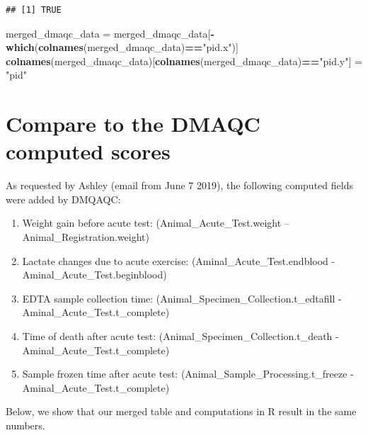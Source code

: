 \documentclass[]{article}
\newenvironment{Shaded}{\begin{snugshade}}{\end{snugshade}}
\newcommand{\KeywordTok}[1]{\textcolor[rgb]{0.13,0.29,0.53}{\textbf{#1}}}
\newcommand{\StringTok}[1]{\textcolor[rgb]{0.31,0.60,0.02}{#1}}
\newcommand{\OperatorTok}[1]{\textcolor[rgb]{0.81,0.36,0.00}{\textbf{#1}}}
\newcommand{\NormalTok}[1]{#1}
\providecommand{\tightlist}{%
  \setlength{\itemsep}{0pt}\setlength{\parskip}{0pt}}
\begin{document}
\begin{verbatim}
## [1] TRUE
\end{verbatim}

\begin{Shaded}
\begin{Highlighting}[]
\NormalTok{merged_dmaqc_data =}\StringTok{ }\NormalTok{merged_dmaqc_data[}\OperatorTok{-}\KeywordTok{which}\NormalTok{(}\KeywordTok{colnames}\NormalTok{(merged_dmaqc_data)}\OperatorTok{==}\StringTok{"pid.x"}\NormalTok{)]}
\KeywordTok{colnames}\NormalTok{(merged_dmaqc_data)[}\KeywordTok{colnames}\NormalTok{(merged_dmaqc_data)}\OperatorTok{==}\StringTok{"pid.y"}\NormalTok{] =}\StringTok{ "pid"}
\end{Highlighting}
\end{Shaded}

\section{Compare to the DMAQC computed
scores}\label{compare-to-the-dmaqc-computed-scores}

As requested by Ashley (email from June 7 2019), the following computed
fields were added by DMQAQC:

\begin{enumerate}
\def\labelenumi{\arabic{enumi}.}
\tightlist
\item
  Weight gain before acute test: (Animal\_Acute\_Test.weight --
  Animal\_Registration.weight)
\item
  Lactate changes due to acute exercise: (Aminal\_Acute\_Test.endblood -
  Aminal\_Acute\_Test.beginblood)
\item
  EDTA sample collection time: (Animal\_Specimen\_Collection.t\_edtafill
  - Aminal\_Acute\_Test.t\_complete)
\item
  Time of death after acute test: (Animal\_Specimen\_Collection.t\_death
  - Aminal\_Acute\_Test.t\_complete)
\item
  Sample frozen time after acute test:
  (Animal\_Sample\_Processing.t\_freeze -
  Aminal\_Acute\_Test.t\_complete)
\end{enumerate}

Below, we show that our merged table and computations in R result in the
same numbers.
\end{document}
